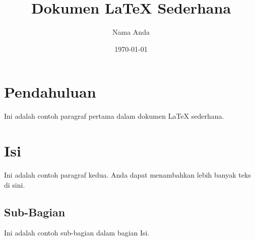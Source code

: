 \documentclass{article}
\begin{document}
\title{Dokumen LaTeX Sederhana}
\author{Nama Anda}
\date{\today}
\maketitle

\section{Pendahuluan}
Ini adalah contoh paragraf pertama dalam dokumen LaTeX sederhana.

\section{Isi}
Ini adalah contoh paragraf kedua. Anda dapat menambahkan lebih banyak teks di sini.

\subsection{Sub-Bagian}
Ini adalah contoh sub-bagian dalam bagian Isi.
\end{document}
